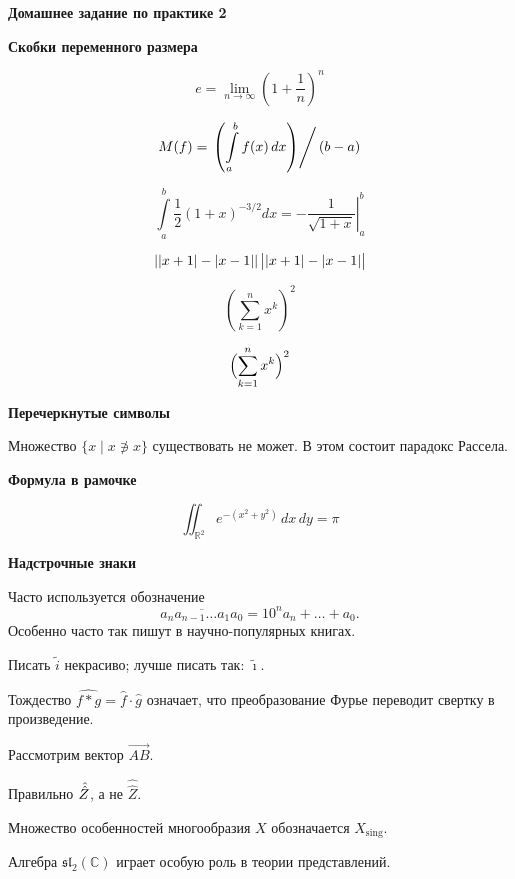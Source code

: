 \documentclass[12pt]{article}
\newcommand{\nl}{\vspace{\baselineskip}} %
\begin{document}
\begin{center} \bf{Домашнее задание по практике 2} \end{center}

\begin{center}
\textbf{Скобки переменного размера}
\end{center}

$$e =  \lim \limits_{n \to \infty} (1 + \frac{1}{n})^n$$

$$M(f)=\left.\left(\int\limits_a^bf(x)\,dx\right)\right/(b-a)$$

$$\int\limits_a^b\frac12(1+x)^{-3/2}dx=\left.-\frac{1}{\sqrt{1+x}}\right|_a^b$$

$$\left| |x+1|-|x-1|\right| \\ \bigl| |x+1|-|x-1|\bigr|$$

$$\left(\sum_{k=1}^n x^k\right)^2$$

$$\Bigl(\sum_{k=1}^n x^k\Bigr)^2$$

\begin{center}
\textbf{Перечеркнутые символы}
\end{center}

Множество $\{x\mid x\not\ni x\}$ существовать не может. В этом состоит парадокс Рассела.

\begin{center}
\textbf{Формула в рамочке}
\end{center}

$$\boxed{\iint_{\mathbb R^2}e^{-(x^2+y^2)}\,dx\,dy=\pi}$$

\begin{center}
\textbf{Надстрочные знаки}
\end{center}

Часто используется обозначение $$\overline{a_na_{n-1}\ldots a_1a_0}=10^na_n+\ldots+a_0.$$
Особенно часто так пишут в научно-популярных книгах.\nl

Писать $\tilde i$ некрасиво; лучше писать так: $\tilde\imath$.\nl

Тождество $\widehat{f*g}=\hat f\cdot\hat g$ означает, что преобразование Фурье переводит свертку в произведение.\nl

Рассмотрим вектор $\overrightarrow{AB}$.\nl

Правильно $\Hat{\Hat Z}$, а не $\hat{\hat Z}$.\nl

Множество особенностей многообразия $X$ обозначается $X_{\mathrm{sing}}$.\nl

Алгебра $\mathfrak{sl}_2(\mathbb C)$ играет особую роль в теории представлений.\nl
\end{document}
